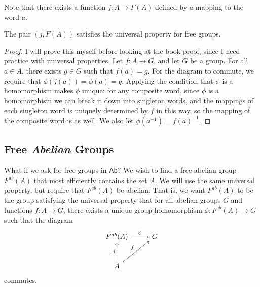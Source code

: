 Note that there exists a function $j : A \to F(A)$ defined by $a$ mapping to the word $a$.
\begin{proposition}\label{prp:2.5.1}
	The pair $(j,F(A))$ satisfies the universal property for free groups.
\end{proposition}
\begin{proof}
	I will prove this myself before looking at the book proof, since I need practice with universal properties. Let $f : A \to G$, and let $G$ be a group. For all $a\in A$, there exists $g\in G$ such that $f(a)=g$. For the diagram to commute, we require that $\phi (j(a))=\phi (a)=g$. Applying the condition that $\phi $ is a homomorphism makes $\phi $ unique: for any composite word, since $\phi $ is a homomorphism we can break it down into singleton words, and the mappings of each singleton word is uniquely determined by $f$ in this way, so the mapping of the composite word is as well. We also let $\phi (a^{-1})=f(a)^{-1}$.
\end{proof}

\subsection{Free \emph{Abelian} Groups}
What if we ask for free groups in $\mathsf{Ab}$? We wish to find a free abelian group $F^{ab}(A)$ that most efficiently contains the set $A$. We will use the same universal property, but require that $F^{ab}(A)$ be abelian. That is, we want $F^{ab}(A)$ to be the group satisfying the universal property that for all abelian groups $G$ and functions $f : A \to G$, there exists a unique group homomorphism $\phi  : F^{ab}(A) \to G$ such that the diagram
\[\begin{tikzcd}[row sep=2.5em, column sep=2.5em]
	F^{ab}(A)\arrow[r, "\phi "]&G\\
	A\arrow[u, "j"]\arrow[ur, "f"]
\end{tikzcd}\]
commutes.

